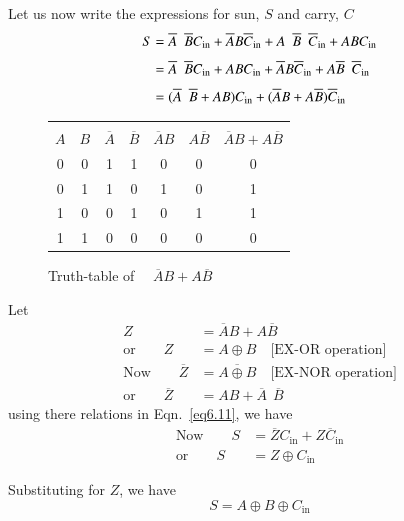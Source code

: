 Let us now write the expressions for sun, $S$ and carry, $C$
\begin{align}
S &= \overline{A}
\ \ \overline{B}C_{\text{in}}+\overline{A}B\overline{C}_{\text{in}}+A
\ \ \overline{B} \ \ \overline{C}_{\text{in}}+ABC_{\text{in}}\notag\\[3pt]
&= \overline{A}
\ \ \overline{B}C_{\text{in}}+ABC_{\text{in}}+\overline{A}B\overline{C}_{\text{in}}+A\overline{B}
\ \ \overline{C}_{\text{in}}\notag\\[3pt]
&= (\overline{A} \ \ \overline{B}+AB)C_{\text{in}}+(\overline{A}B+A\overline{B})\overline{C}_{\text{in}}\label{eq6.11}
\end{align}
\begin{figure}[H]
\centering
\tabcolsep=6pt
\renewcommand{\arraystretch}{1.2}
\begin{tabular}{|cc|ccccc|}
\hline
&&&&&&\\[-14pt]
\boldmath$A$ & \boldmath$B$ & \boldmath$\overline{A}$ & \boldmath$\overline{B}$ & \boldmath$\overline{A}B$ & \boldmath$A\overline{B}$ & \boldmath$\overline{A}B+A\overline{B}$\\
\hline
0 & 0 & 1 & 1 & 0 & 0 & 0\\
0 & 1 & 1 & 0 & 1 & 0 & 1\\
1 & 0 & 0 & 1 & 0 & 1 & 1\\
1 & 1 & 0 & 0 & 0 & 0 & 0\\
\hline
\end{tabular}
\caption{Truth-table of  \ \ $\overline{A}B+A\overline{B}$}\label{tab6.32}
\end{figure}
Let
\begin{align*}
Z &= \overline{A}B+A\overline{B}\\[4pt]
\text{or}\qquad Z &= A\oplus B\quad\text{[EX-OR operation]}\\[4pt]
\text{Now}\qquad \overline{Z} &= \overline{A\oplus B}\quad
\text{[EX-NOR operation]}\\[4pt]
\text{or}\qquad \overline{Z} &= AB+\overline{A} \ \ \overline{B}
\end{align*}
using there relations in Eqn.~\eqref{eq6.11}, we have
\begin{align*}
\text{Now}\qquad S &=
\overline{Z}C_{\text{in}}+Z\overline{C}_{\text{in}}\\[4pt]
\text{or}\qquad S &= Z\oplus C_{\text{in}}
\end{align*}

Substituting for $Z$, we have
\begin{equation}
S= A\oplus B\oplus C_{\text{in}}\label{eq6.12}
\end{equation}

